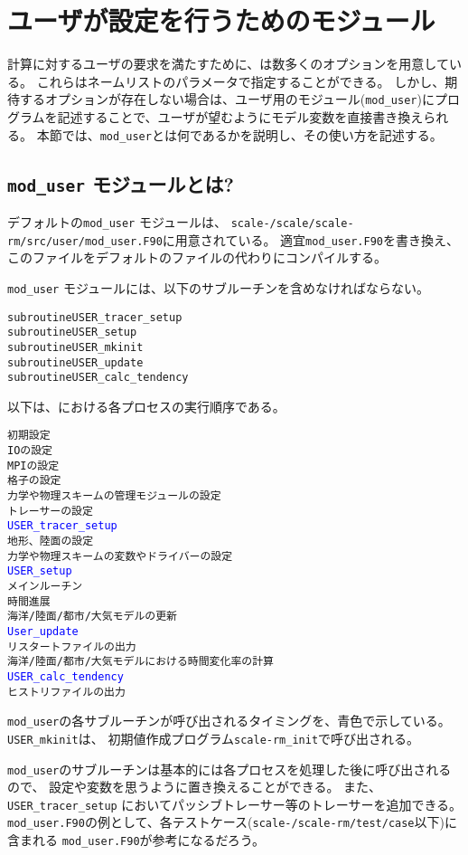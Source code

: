 \section{ユーザが設定を行うためのモジュール} \label{sec:mod_user}

計算に対するユーザの要求を満たすために、\scalerm は数多くのオプションを用意している。
これらはネームリストのパラメータで指定することができる。
しかし、期待するオプションが存在しない場合は、ユーザ用のモジュール(\verb|mod_user|)にプログラムを記述することで、ユーザが望むようにモデル変数を直接書き換えられる。
本節では、\verb|mod_user|とは何であるかを説明し、その使い方を記述する。

\subsection{\texttt{mod\_user} モジュールとは?}

デフォルトの\verb|mod_user| モジュールは、 \texttt{scale-{\version}/scale/scale-rm/src/user/mod\_user.F90}に用意されている。
適宜\verb|mod_user.F90|を書き換え、このファイルをデフォルトのファイルの代わりにコンパイルする。

\verb|mod_user| モジュールには、以下のサブルーチンを含めなければならない。
\begin{alltt}
  subroutine USER_tracer_setup
  subroutine USER_setup
  subroutine USER_mkinit
  subroutine USER_update
  subroutine USER_calc_tendency
\end{alltt}

\noindent 以下は、\scalerm における各プロセスの実行順序である。
\begin{alltt}
初期設定
  IOの設定
  MPIの設定
  格子の設定
  力学や物理スキームの管理モジュールの設定
  トレーサーの設定
  \textcolor{blue}{USER_tracer_setup}
  地形、陸面の設定
  力学や物理スキームの変数やドライバーの設定
  \textcolor{blue}{USER_setup}
メインルーチン
  時間進展
  海洋/陸面/都市/大気モデルの更新
  \textcolor{blue}{User_update}
  リスタートファイルの出力
  海洋/陸面/都市/大気モデルにおける時間変化率の計算
  \textcolor{blue}{USER_calc_tendency}
  ヒストリファイルの出力
\end{alltt}
\verb|mod_user|の各サブルーチンが呼び出されるタイミングを、青色で示している。
\verb|USER_mkinit|は、 初期値作成プログラム\verb|scale-rm_init|で呼び出される。


\verb|mod_user|のサブルーチンは基本的には各プロセスを処理した後に呼び出されるので、
設定や変数を思うように置き換えることができる。
また、\verb|USER_tracer_setup| においてパッシブトレーサー等のトレーサーを追加できる。
\verb|mod_user.F90|の例として、各テストケース(\texttt{scale-{\version}/scale-rm/test/case}以下)に含まれる
\verb|mod_user.F90|が参考になるだろう。


